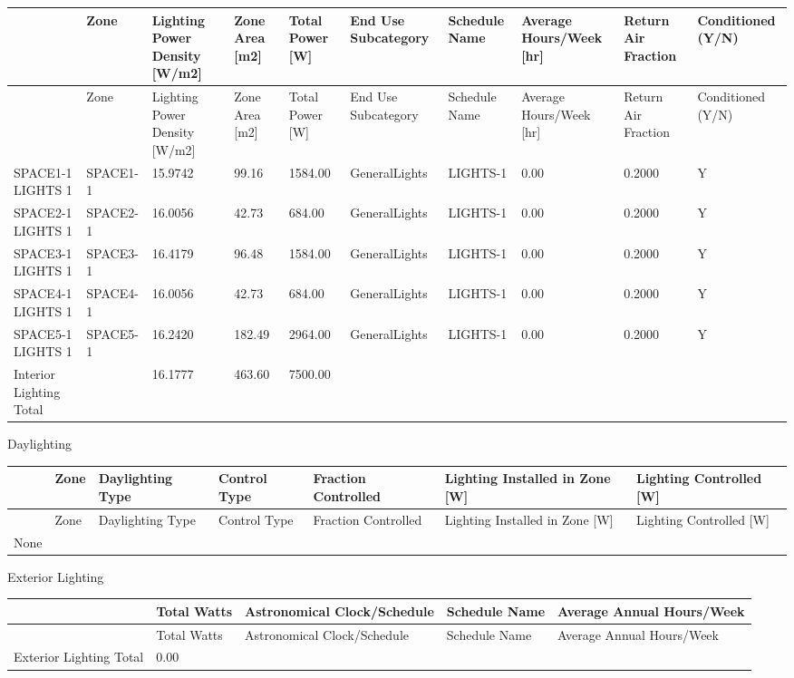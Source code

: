 {\scriptsize
\begin{longtable}[c]{>{\raggedright}p{0.6in}>{\raggedright}p{0.6in}>{\raggedright}p{0.5in}>{\raggedright}p{0.5in}>{\raggedright}p{0.5in}>{\raggedright}p{0.6in}>{\raggedright}p{0.6in}>{\raggedright}p{0.5in}>{\raggedright}p{0.5in}>{\raggedright}p{0.5in}}
\toprule 
~ & Zone & Lighting Power Density [W/m2] & Zone Area [m2] & Total Power [W] & End Use Subcategory & Schedule Name & Average Hours/Week [hr] & Return Air Fraction & Conditioned (Y/N) \tabularnewline
\midrule
\endfirsthead

\toprule 
~ & Zone & Lighting Power Density [W/m2] & Zone Area [m2] & Total Power [W] & End Use Subcategory & Schedule Name & Average Hours/Week [hr] & Return Air Fraction & Conditioned (Y/N) \tabularnewline
\midrule
\endhead

SPACE1-1 LIGHTS 1 & SPACE1-1 & 15.9742 & 99.16 & 1584.00 & GeneralLights & LIGHTS-1 & 0.00 & 0.2000 & Y \tabularnewline
SPACE2-1 LIGHTS 1 & SPACE2-1 & 16.0056 & 42.73 & 684.00 & GeneralLights & LIGHTS-1 & 0.00 & 0.2000 & Y \tabularnewline
SPACE3-1 LIGHTS 1 & SPACE3-1 & 16.4179 & 96.48 & 1584.00 & GeneralLights & LIGHTS-1 & 0.00 & 0.2000 & Y \tabularnewline
SPACE4-1 LIGHTS 1 & SPACE4-1 & 16.0056 & 42.73 & 684.00 & GeneralLights & LIGHTS-1 & 0.00 & 0.2000 & Y \tabularnewline
SPACE5-1 LIGHTS 1 & SPACE5-1 & 16.2420 & 182.49 & 2964.00 & GeneralLights & LIGHTS-1 & 0.00 & 0.2000 & Y \tabularnewline
Interior Lighting Total & ~ & 16.1777 & 463.60 & 7500.00 & ~ & ~ & ~ & ~ & ~ \tabularnewline
\bottomrule
\end{longtable}}

Daylighting

\begin{longtable}[c]{>{\raggedright}p{0.85in}>{\raggedright}p{0.85in}>{\raggedright}p{0.85in}>{\raggedright}p{0.85in}>{\raggedright}p{0.85in}>{\raggedright}p{0.85in}>{\raggedright}p{0.85in}}
\toprule 
~ & Zone & Daylighting Type & Control Type & Fraction Controlled & Lighting Installed in Zone [W] & Lighting Controlled [W] \tabularnewline
\midrule
\endfirsthead

\toprule 
~ & Zone & Daylighting Type & Control Type & Fraction Controlled & Lighting Installed in Zone [W] & Lighting Controlled [W] \tabularnewline
\midrule
\endhead

None & ~ & ~ & ~ & ~ & ~ & ~ \tabularnewline
\bottomrule
\end{longtable}

Exterior Lighting

\begin{longtable}[c]{>{\raggedright}p{1.2in}>{\raggedright}p{1.2in}>{\raggedright}p{1.2in}>{\raggedright}p{1.2in}>{\raggedright}p{1.2in}}
\toprule 
~ & Total Watts & Astronomical Clock/Schedule & Schedule Name & Average Annual Hours/Week \tabularnewline
\midrule
\endfirsthead

\toprule 
~ & Total Watts & Astronomical Clock/Schedule & Schedule Name & Average Annual Hours/Week \tabularnewline
\midrule
\endhead

Exterior Lighting Total & 0.00 & ~ & ~ & ~ \tabularnewline
\bottomrule
\end{longtable}

